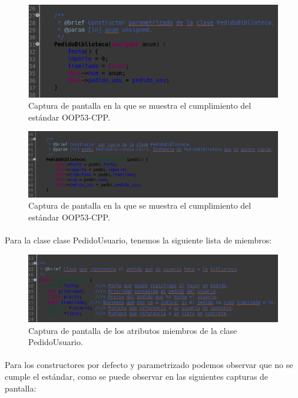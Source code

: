 			\begin{figure}[H]
				\centering
				\includegraphics[scale=0.7]{img/captura24.png}
				\caption{Captura de pantalla en la que se muestra el cumplimiento del estándar OOP53-CPP.}
				\label{captura24}
			\end{figure}
		
			\begin{figure}[H]
				\centering
				\includegraphics[scale=0.5]{img/captura26.png}
				\caption{Captura de pantalla en la que se muestra el cumplimiento del estándar OOP53-CPP.}
				\label{captura26}
			\end{figure}
		
			\paragraph{}Para la clase clase PedidoUsuario, tenemos la siguiente lista de miembros:
			
			\begin{figure}[H]
				\centering
				\includegraphics[scale=0.5]{img/captura27.png}
				\caption{Captura de pantalla de los atributos miembros de la clase PedidoUsuario.}
				\label{captura27}
			\end{figure}
		
			\paragraph{}Para los constructores por defecto y parametrizado podemos observar que no se cumple el estándar, como se puede observar en las siguientes capturas de pantalla:
			
